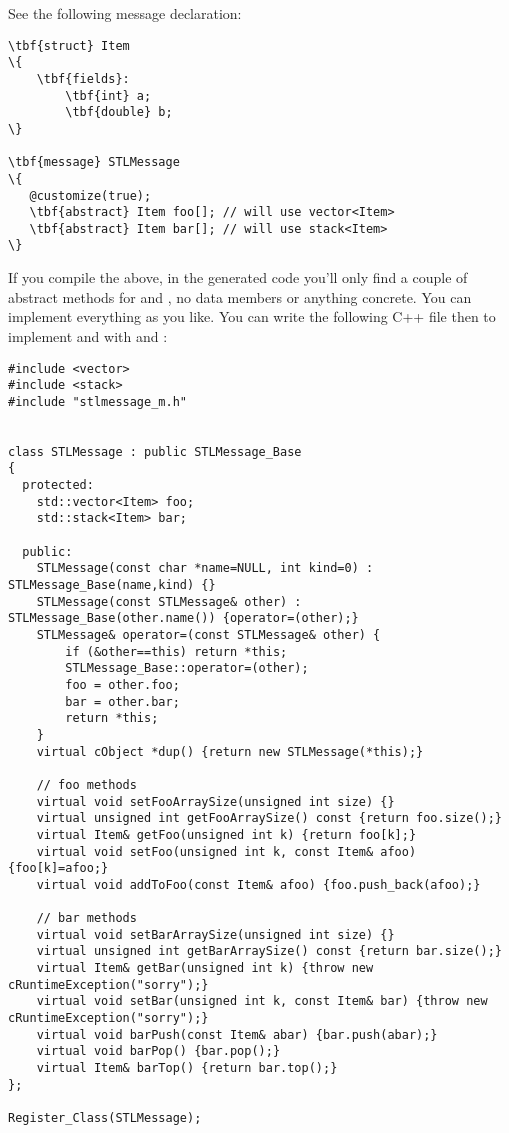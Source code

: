 See the following message declaration:

\begin{Verbatim}[commandchars=\\\{\}]
\tbf{struct} Item
\{
    \tbf{fields}:
        \tbf{int} a;
        \tbf{double} b;
\}

\tbf{message} STLMessage
\{
   @customize(true);
   \tbf{abstract} Item foo[]; // will use vector<Item>
   \tbf{abstract} Item bar[]; // will use stack<Item>
\}
\end{Verbatim}

If you compile the above, in the generated code you'll only find a couple of
abstract methods for  and , no data members or anything concrete.
You can implement everything as you like. You can write the following C++ file
then to implement  and  with  and :

\begin{verbatim}
#include <vector>
#include <stack>
#include "stlmessage_m.h"


class STLMessage : public STLMessage_Base
{
  protected:
    std::vector<Item> foo;
    std::stack<Item> bar;

  public:
    STLMessage(const char *name=NULL, int kind=0) : STLMessage_Base(name,kind) {}
    STLMessage(const STLMessage& other) : STLMessage_Base(other.name()) {operator=(other);}
    STLMessage& operator=(const STLMessage& other) {
        if (&other==this) return *this;
        STLMessage_Base::operator=(other);
        foo = other.foo;
        bar = other.bar;
        return *this;
    }
    virtual cObject *dup() {return new STLMessage(*this);}

    // foo methods
    virtual void setFooArraySize(unsigned int size) {}
    virtual unsigned int getFooArraySize() const {return foo.size();}
    virtual Item& getFoo(unsigned int k) {return foo[k];}
    virtual void setFoo(unsigned int k, const Item& afoo) {foo[k]=afoo;}
    virtual void addToFoo(const Item& afoo) {foo.push_back(afoo);}

    // bar methods
    virtual void setBarArraySize(unsigned int size) {}
    virtual unsigned int getBarArraySize() const {return bar.size();}
    virtual Item& getBar(unsigned int k) {throw new cRuntimeException("sorry");}
    virtual void setBar(unsigned int k, const Item& bar) {throw new cRuntimeException("sorry");}
    virtual void barPush(const Item& abar) {bar.push(abar);}
    virtual void barPop() {bar.pop();}
    virtual Item& barTop() {return bar.top();}
};

Register_Class(STLMessage);
\end{verbatim}

